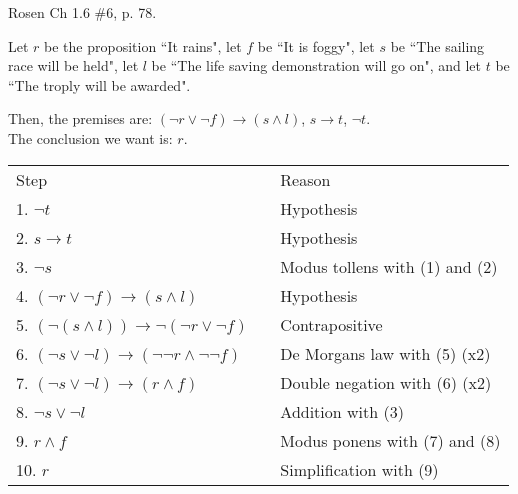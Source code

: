 \documentclass[12pt,addpoints]{exam}
\begin{document}
\begin{questions}
\question[10] Rosen Ch 1.6 \#6, p. 78.
    \begin{solution}
    Let $r$ be the proposition ``It rains", let $f$ be ``It is foggy",
    let $s$ be ``The sailing race will be held", let $l$ be ``The life
    saving demonstration will go on", and let $t$ be ``The troply will
    be awarded".

    Then, the premises are: $(\neg r \vee \neg f) \rightarrow (s \wedge l)$, $s \rightarrow t$, $\neg t$. \\
    The conclusion we want is: $r$.

    \begin{tabular}{lll}
        Step    & \hspace{0.2in} & Reason \\
        1. $\neg t$                 &       & Hypothesis \\
        2. $s \rightarrow t$        &       & Hypothesis \\
        3. $\neg s$                 &       & Modus tollens with (1) and (2) \\
        4. $(\neg r \vee \neg f) \rightarrow (s \wedge l)$  &   & Hypothesis \\
        5. $(\neg(s \wedge l)) \rightarrow \neg(\neg r \vee \neg f)$    & & Contrapositive \\
        6. $(\neg s \vee \neg l) \rightarrow (\neg \neg r \wedge \neg \neg f)$ & & De Morgans law with (5) (x2) \\
        7. $(\neg s \vee \neg l) \rightarrow (r \wedge f)$  & & Double negation with (6) (x2) \\
        8. $\neg s \vee \neg l$     &       & Addition with (3) \\
        9. $r \wedge f$             &       & Modus ponens with (7) and (8) \\
        10. $r$                     &       & Simplification with (9)
    \end{tabular}
    \end{solution}


\end{questions}
\end{document}
